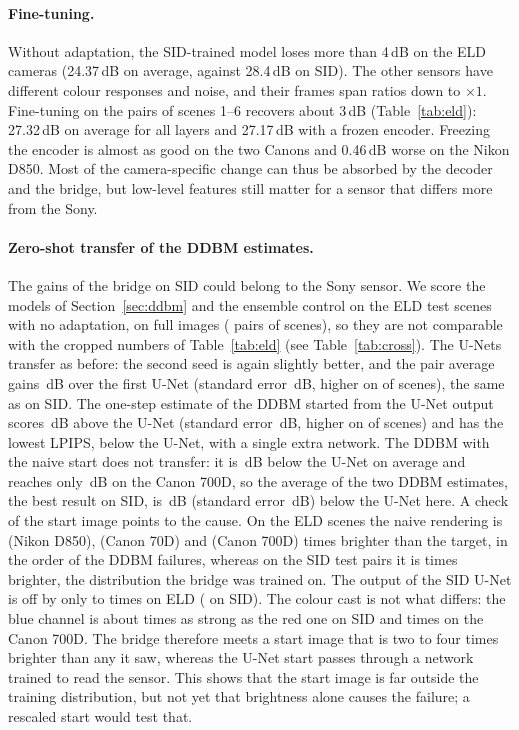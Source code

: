 \paragraph{Fine-tuning.} Without adaptation, the SID-trained model loses more than 4\,dB on the ELD cameras (24.37\,dB on average, against 28.4\,dB on SID). The other sensors have different colour responses and noise, and their frames span ratios down to $\times1$. Fine-tuning on the \ELDFTPAIRS{} pairs of scenes 1--6 recovers about 3\,dB (Table~\ref{tab:eld}): 27.32\,dB on average for all layers and 27.17\,dB with a frozen encoder. Freezing the encoder is almost as good on the two Canons and 0.46\,dB worse on the Nikon D850. Most of the camera-specific change can thus be absorbed by the decoder and the bridge, but low-level features still matter for a sensor that differs more from the Sony.

\paragraph{Zero-shot transfer of the DDBM estimates.} The gains of the bridge on SID could belong to the Sony sensor. We score the models of Section~\ref{sec:ddbm} and the ensemble control on the ELD test scenes with no adaptation, on full images (\CROSSN{} pairs of \CROSSSCENES{} scenes), so they are not comparable with the cropped numbers of Table~\ref{tab:eld} (see Table~\ref{tab:cross}). The U-Nets transfer as before: the second seed is again slightly better, and the pair average gains \XABA\,dB over the first U-Net (standard error \XABASE\,dB, higher on \XABAWIN{} of \CROSSSCENES{} scenes), the same as on SID. The one-step estimate of the DDBM started from the U-Net output scores \XUSA\,dB above the U-Net (standard error \XUSASE\,dB, higher on \XUSAWIN{} of \CROSSSCENES{} scenes) and has the lowest LPIPS, \XUSLPIPS{} below the U-Net, with a single extra network. The DDBM with the naive start does not transfer: it is \XNAIVEAABS\,dB below the U-Net on average and reaches only \XNAIVECANONB\,dB on the Canon 700D, so the average of the two DDBM estimates, the best result on SID, is \XPAIRAABS\,dB (standard error \XPAIRASE\,dB) below the U-Net here. A check of the start image points to the cause. On the ELD scenes the naive rendering is \DIAGXTNIKON{} (Nikon D850), \DIAGXTSEVENTY{} (Canon 70D) and \DIAGXTSEVENHUNDRED{} (Canon 700D) times brighter than the target, in the order of the DDBM failures, whereas on the \DIAGSIDN{} SID test pairs it is \DIAGXTSID{} times brighter, the distribution the bridge was trained on. The output of the SID U-Net is off by only \DIAGUNNIKON{} to \DIAGUNSEVENHUNDRED{} times on ELD (\DIAGUNSID{} on SID). The colour cast is not what differs: the blue channel is about \DIAGBRSID{} times as strong as the red one on SID and \DIAGBR{} times on the Canon 700D. The bridge therefore meets a start image that is two to four times brighter than any it saw, whereas the U-Net start passes through a network trained to read the sensor. This shows that the start image is far outside the training distribution, but not yet that brightness alone causes the failure; a rescaled start would test that.

